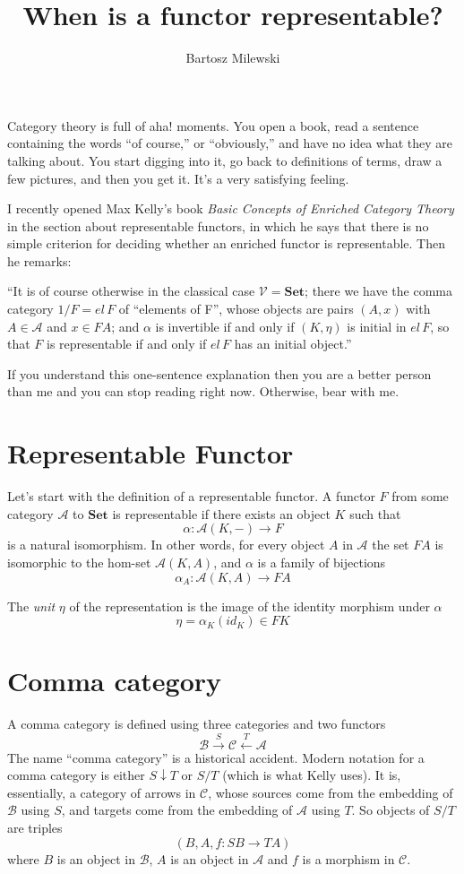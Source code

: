 \documentclass[11pt]{amsart}
\author{Bartosz Milewski}
\title{When is a functor representable?}
\newcommand{\Cat}[1]{\mathbf{#1}}
\newcommand{\cat}[1]{\mathcal{#1}}
\begin{document}
\maketitle{}
Category theory is full of aha! moments. You open a book, read a sentence containing the words ``of course,'' or ``obviously,'' and have no idea what they are talking about. You start digging into it, go back to definitions of terms, draw a few pictures, and then you get it. It's a very satisfying feeling. 

I recently opened Max Kelly's book \emph{Basic Concepts of Enriched Category Theory} in the section about representable functors, in which he says that there is no simple criterion for deciding whether an enriched functor is representable. Then he remarks: 

``It is of course otherwise in the classical case $\cat V = \Cat{Set}$; there we have the comma category $1/F = el \,F$  of ``elements of F'', whose objects are pairs $(A, x)$ with $A \in \cat A$ and $x \in F A$; and $\alpha$ is invertible if and only if $(K, \eta)$ is initial in $el \, F$, so that $F$ is representable if and only if $el \, F$ has an initial object.''

If you understand this one-sentence explanation then you are a better person than me and you can stop reading right now. Otherwise, bear with me.

\section{Representable Functor}

Let's start with the definition of a representable functor. A functor $F$ from some category $\cat A$ to $\Cat{Set}$ is representable if there exists an object $K$ such that 
\[ \alpha \colon \cat A (K, -) \to F\]
is a natural isomorphism. In other words, for every object $A$ in $\cat A$ the set $F A$ is isomorphic to the hom-set $\cat A (K, A)$, and $\alpha$ is a family of bijections
\[\alpha_A \colon \cat{A} (K, A) \to F A\]

The \emph{unit} $\eta$ of the representation is the image of the identity morphism under $\alpha$
\[\eta = \alpha_K (id_K) \in F K\]

\section{Comma category}

A comma category is defined using three categories and two functors
\[ \cat B \xrightarrow{S} \cat C \xleftarrow{T} \cat A \]
 The name ``comma category'' is a historical accident. Modern notation for a comma category is either $S \downarrow T$ or $S / T$ (which is what Kelly uses). It is, essentially, a category of arrows in $\cat C$, whose sources come from the embedding of $\cat B$ using $S$, and targets come from  the embedding of $\cat A$ using $T$. So objects of $S / T$ are triples
 \[(B, A, f \colon S B \to T A)\]
 where $B$ is an object in $\cat B$, $A$ is an object in $\cat A$ and $f$ is a morphism in $\cat C$. 
 
\end{document}
